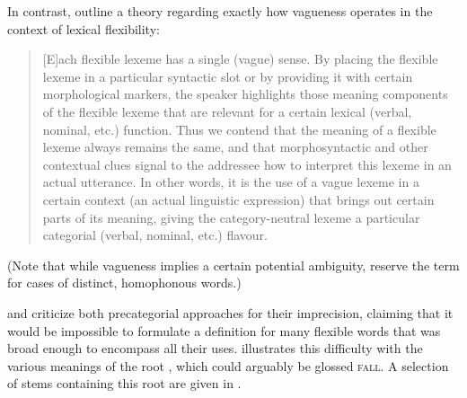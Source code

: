 In contrast, \textcite[539--541]{HengeveldRijkhoffSiewierska2004} outline a theory regarding exactly how vagueness operates in the context of lexical flexibility:

\blockquote[{\cite[541]{HengeveldRijkhoff2005}}]{[E]ach flexible lexeme has a single (vague) sense. By placing the flexible lexeme in a particular syntactic slot or by providing it with certain morphological markers, the speaker highlights those meaning components of the flexible lexeme that are relevant for a certain lexical (verbal, nominal, etc.) function. Thus we contend that the meaning of a flexible lexeme always remains the same, and that morphosyntactic and other contextual clues signal to the addressee how to interpret this lexeme in an actual utterance. In other words, it is the use of a vague lexeme in a certain context (an actual linguistic expression) that brings out certain parts of its meaning, giving the category-neutral lexeme a particular categorial (verbal, nominal, etc.) flavour.}

\noindent (Note that while vagueness implies a certain potential ambiguity, \citeauthor{HengeveldRijkhoff2005} reserve the term  for cases of distinct, homophonous words.)

\textcite[363--364]{EvansOsada2005} and \textcite{Kihm2017} criticize both precategorial approaches for their imprecision, claiming that it would be impossible to formulate a definition for many flexible words that was broad enough to encompass all their uses. \textcite[87]{Kihm2017} illustrates this difficulty with the various meanings of the  root , which could arguably be glossed \textsc{fall}. A selection of stems containing this root are given in .

